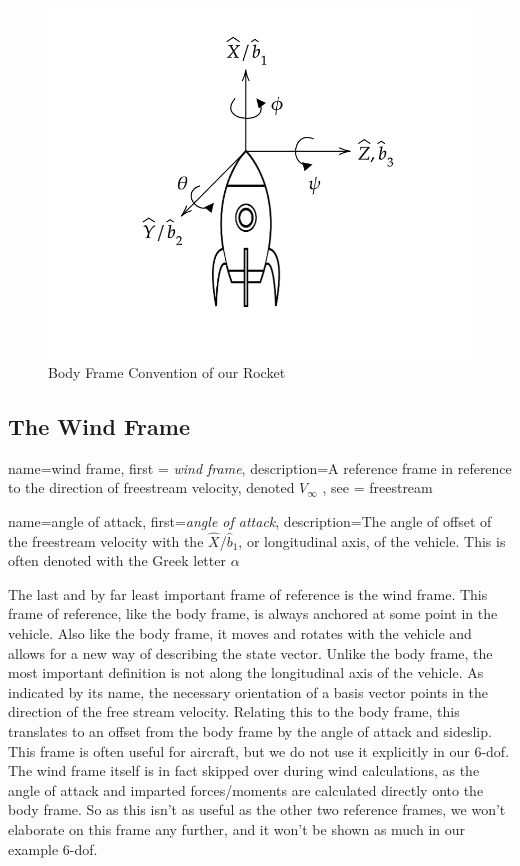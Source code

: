 \documentclass[12pt]{report}
\begin{document}
\begin{figure}[H]
\centering
\includegraphics[width=\linewidth]{Images/RocketBodyFrame.png}
    \caption{Body Frame Convention of our Rocket}
    \label{fig:BodyFrameRocket}
\end{figure}

\subsection{The Wind Frame}

{
    name=wind frame,
    first = {\textit{wind frame}},
    description={A reference frame in reference to the direction of freestream velocity, denoted $V_{\infty}$}
},
see = {freestream}

{
    name=angle of attack,
    first={\textit{angle of attack}},
    description={The angle of offset of the freestream velocity with the $\hat{X}$/$\hat{b}_1$, or longitudinal axis, of the vehicle. This is often denoted with the Greek letter $\alpha$}
}

The last and by far least important frame of reference is the \gls{wind frame}. This frame of reference, like the \gls{body frame}, is always anchored at some point in the vehicle. Also like the \gls{body frame}, it moves and rotates with the vehicle and allows for a new way of describing the \gls{state vector}. Unlike the \gls{body frame}, the most important definition is not along the longitudinal axis of the vehicle. As indicated by its name, the necessary orientation of a basis vector points in the direction of the free stream velocity. Relating this to the \gls{body frame}, this translates to an offset from the \gls{body frame} by the \gls{angle of attack} and sideslip. This frame is often useful for aircraft, but we do not use it explicitly in our 6-\gls{dof}. The \gls{wind frame} itself is in fact skipped over during wind calculations, as the \gls{angle of attack} and imparted forces/moments are calculated directly onto the \gls{body frame}. So as this isn’t as useful as the other two reference frames, we won’t elaborate on this frame any further, and it won’t be shown as much in our example 6-\gls{dof}.
\end{document}
